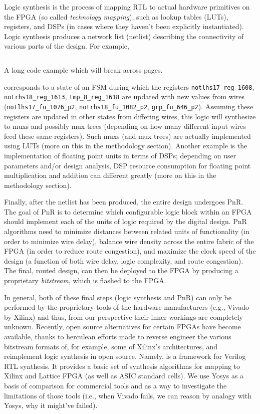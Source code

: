 Logic synthesis is the process of mapping RTL to actual hardware primitives on the FPGA (so called \emph{technology mapping}), such as lookup tables (LUTs), registers, and DSPs (in cases where they haven't been explicitly instantiated).
Logic synthesis produces a network list (netlist) describing the connectivity of various parts of the design.
For example,
\begin{longlisting}
	\inputminted{verilog}{sources/always.v}
	\caption[Long Code Example]{A long code example which will break across pages.}
	\label{lst:long}
\end{longlisting}
\noindent corresponds to a state of an FSM during which the registers \texttt{notlhs17_reg_1608}, \texttt{notrhs18_reg_1613}, \texttt{tmp_8_reg_1618} are updated with new values from wires (\texttt{notlhs17_fu_1076_p2}, \texttt{notrhs18_fu_1082_p2}, \texttt{grp_fu_646_p2}).
Assuming these registers are updated in other states from differing wires, this logic will synthesize to muxs and possibly mux trees (depending on how many different input wires feed these same registers).
Such muxs (and mux trees) are actually implemented using LUTs (more on this in the methodology section).
Another example is the implementation of floating point units in terms of DSPs; depending on user parameters and/or design analysis, DSP resource consumption for floating point multiplication and addition can different greatly (more on this in the methodology section).

Finally, after the netlist has been produced, the entire design undergoes PnR.
The goal of PnR is to determine which configurable logic block within an FPGA should implement each of the units of logic required by the digital design.
PnR algorithms need to minimize distances between related units of functionality (in order to minimize wire delay), balance wire density across the entire fabric of the FPGA (in order to reduce route congestion), and maximize the clock speed of the design (a function of both wire delay, logic complexity, and route congestion).
The final, routed design, can then be deployed to the FPGA by producing a proprietary \emph{bitstream}, which is flashed to the FPGA.

In general, both of these final steps (logic synthesis and PnR) can only be performed by the proprietary tools of the hardware manufacturers (e.g., Vivado by Xilinx) and thus, from our perspective their inner workings are completely unknown.
Recently, open source alternatives for certain FPGAs have become available, thanks to herculean efforts made to reverse engineer the various bitstream formats of, for example, some of Xilinx's architectures\cite{6546003}, and reimplement logic synthesis in open source.
Namely, \cite{wolf2013yosys} is a framework for Verilog RTL synthesis.
It provides a basic set of synthesis algorithms for mapping to Xilinx and Lattice FPGA (as well as ASIC standard cells).
We use Yosys as a basis of comparison for commercial tools and as a way to investigate the limitations of those tools (i.e., when Vivado fails, we can reason by analogy with Yosys, why it might've failed).